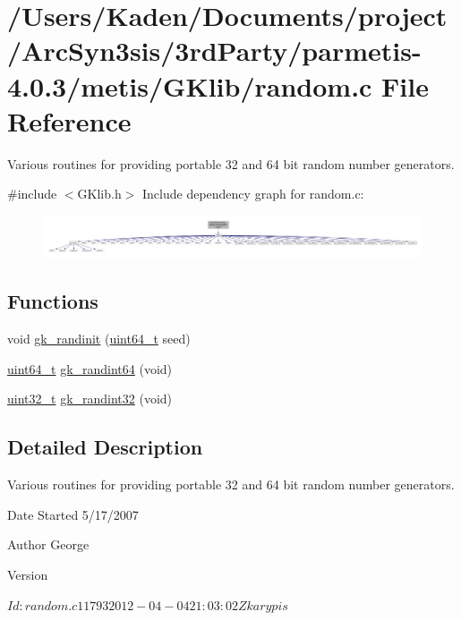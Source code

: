 \hypertarget{a00131}{}\section{/\+Users/\+Kaden/\+Documents/project/\+Arc\+Syn3sis/3rd\+Party/parmetis-\/4.0.3/metis/\+G\+Klib/random.c File Reference}
\label{a00131}


Various routines for providing portable 32 and 64 bit random number generators.  


{\ttfamily \#include $<$G\+Klib.\+h$>$}\newline
Include dependency graph for random.\+c\+:\nopagebreak
\begin{figure}[H]
\begin{center}
\leavevmode
\includegraphics[width=350pt]{a00132}
\end{center}
\end{figure}
\subsection*{Functions}
\begin{DoxyCompactItemize}
\item 
void \hyperlink{a00131_ae9493cf6b5b4bf33f152f2f37c87a3ac}{gk\+\_\+randinit} (\hyperlink{a00119_aec6fcb673ff035718c238c8c9d544c47}{uint64\+\_\+t} seed)
\item 
\hyperlink{a00119_aec6fcb673ff035718c238c8c9d544c47}{uint64\+\_\+t} \hyperlink{a00131_a2a2322fc19f0dfd85b92cf6325c743a2}{gk\+\_\+randint64} (void)
\item 
\hyperlink{a00119_a6eb1e68cc391dd753bc8ce896dbb8315}{uint32\+\_\+t} \hyperlink{a00131_a8e801d60d0dbdf0213d39cf210cddf11}{gk\+\_\+randint32} (void)
\end{DoxyCompactItemize}


\subsection{Detailed Description}
Various routines for providing portable 32 and 64 bit random number generators. 

\begin{DoxyDate}{Date}
Started 5/17/2007 
\end{DoxyDate}
\begin{DoxyAuthor}{Author}
George 
\end{DoxyAuthor}
\begin{DoxyVersion}{Version}
\begin{DoxyVerb}$Id: random.c 11793 2012-04-04 21:03:02Z karypis $ \end{DoxyVerb}
 
\end{DoxyVersion}


